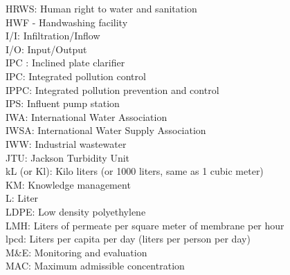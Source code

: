 \documentclass{article}
\begin{document}
HRWS: Human right to water and sanitation
\vspace{0.3cm}\\
HWF - Handwashing facility
\vspace{0.3cm}\\
I/I:  Infiltration/Inflow
\vspace{0.3cm}\\
I/O:  Input/Output
\vspace{0.3cm}\\
IPC :  Inclined plate clarifier
\vspace{0.3cm}\\
IPC:  Integrated pollution control
\vspace{0.3cm}\\
IPPC:  Integrated pollution prevention and control
\vspace{0.3cm}\\
IPS:  Influent pump station
\vspace{0.3cm}\\
IWA:  International Water Association
\vspace{0.3cm}\\
IWSA:  International Water Supply Association
\vspace{0.3cm}\\
IWW:  Industrial wastewater
\vspace{0.3cm}\\
JTU:  Jackson Turbidity Unit
\vspace{0.3cm}\\
kL (or Kl):  Kilo liters (or 1000 liters, same as 1 cubic meter)
\vspace{0.3cm}\\
KM:  Knowledge management
\vspace{0.3cm}\\
L:  Liter
\vspace{0.3cm}\\
LDPE:  Low density polyethylene
\vspace{0.3cm}\\
LMH:  Liters of permeate per square meter of membrane per hour
\vspace{0.3cm}\\
lpcd:  Liters per capita per day (liters per person per day)
\vspace{0.3cm}\\
M\&E:  Monitoring and evaluation
\vspace{0.3cm}\\
MAC:  Maximum admissible concentration
\vspace{0.3cm}\\
\end{document}
